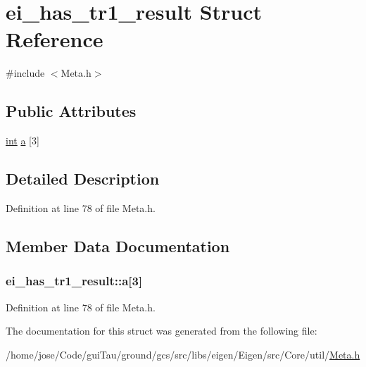 \hypertarget{structei__has__tr1__result}{\section{ei\-\_\-has\-\_\-tr1\-\_\-result Struct Reference}
\label{structei__has__tr1__result}
}


{\ttfamily \#include $<$Meta.\-h$>$}

\subsection*{Public Attributes}
\begin{DoxyCompactItemize}
\item 
\hyperlink{ioapi_8h_a787fa3cf048117ba7123753c1e74fcd6}{int} \hyperlink{structei__has__tr1__result_aa2b018ae0bbb41d72e38c9de7a516faa}{a} \mbox{[}3\mbox{]}
\end{DoxyCompactItemize}


\subsection{Detailed Description}


Definition at line 78 of file Meta.\-h.



\subsection{Member Data Documentation}
\hypertarget{structei__has__tr1__result_aa2b018ae0bbb41d72e38c9de7a516faa}{
\subsubsection[{a}]{ ei\-\_\-has\-\_\-tr1\-\_\-result\-::a\mbox{[}3\mbox{]}}}\label{structei__has__tr1__result_aa2b018ae0bbb41d72e38c9de7a516faa}


Definition at line 78 of file Meta.\-h.



The documentation for this struct was generated from the following file\-:\begin{DoxyCompactItemize}
\item 
/home/jose/\-Code/gui\-Tau/ground/gcs/src/libs/eigen/\-Eigen/src/\-Core/util/\hyperlink{_meta_8h}{Meta.\-h}\end{DoxyCompactItemize}
